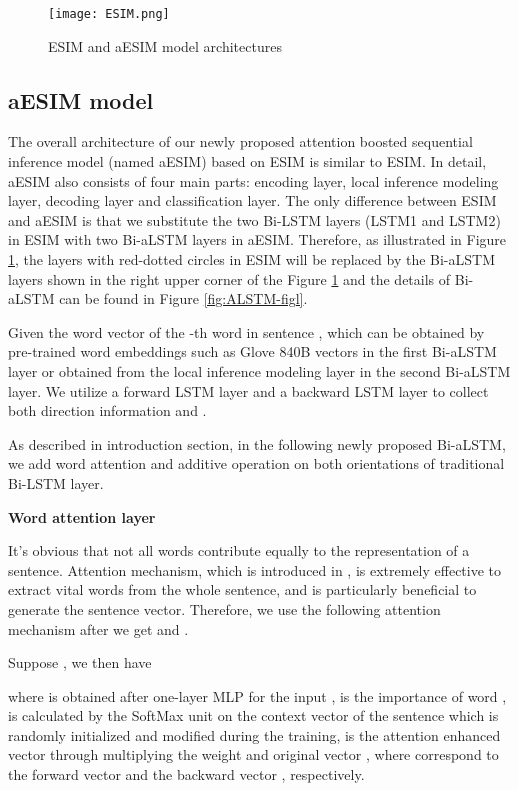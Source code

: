 \documentclass[10pt,sigconf]{acmart}
\begin{document}
\begin{figure}[h]
    \centering
    \texttt{[image: ESIM.png]}
    \caption{ESIM and aESIM model architectures}
    \label{fig:ESIM-figl}
\end{figure}

\subsection{aESIM model}

The overall architecture of our newly proposed attention boosted sequential inference model (named aESIM) based on ESIM is similar to ESIM. In detail, aESIM also consists of four main parts: encoding layer, local inference modeling layer, decoding layer and classification layer. The only difference between ESIM and aESIM is that we substitute the two Bi-LSTM layers (LSTM1 and LSTM2) in ESIM with two Bi-aLSTM layers in aESIM. Therefore, as illustrated in Figure \ref{fig:ESIM-figl}, the layers with red-dotted circles in ESIM will be replaced by the Bi-aLSTM layers shown in the right upper corner of the Figure \ref{fig:ESIM-figl} and the details of Bi-aLSTM can be found in Figure \ref{fig:ALSTM-figl}.

Given the word vector  of the -th word in sentence , which can be obtained by pre-trained word embeddings such as Glove 840B vectors \cite{pennington2014glove} in the first Bi-aLSTM layer or obtained from the local inference modeling layer in the second Bi-aLSTM layer. We utilize a forward LSTM layer and a backward LSTM layer to collect both direction information  and  .



As described in introduction section, in the following newly proposed Bi-aLSTM, we add word attention and additive operation on both orientations of traditional Bi-LSTM layer.

\textbf{Word attention layer}

It’s obvious that not all words contribute equally to the representation of a sentence. Attention mechanism, which is introduced in \cite{yang2016hierarchical}, is extremely effective to extract vital words from the whole sentence, and is particularly beneficial to generate the sentence vector. Therefore, we use the following attention mechanism after we get  and .

Suppose , we then have



where  is obtained after one-layer MLP for the input ,  is the importance of word , is calculated by the SoftMax unit on the context vector  of the sentence  which is randomly initialized and modified during the training,  is the attention enhanced vector through multiplying the weight  and original vector , where  correspond to the forward vector  and the backward vector , respectively.
\end{document}
